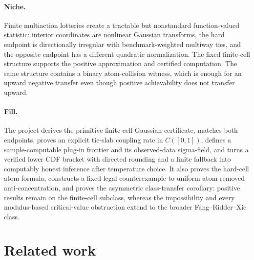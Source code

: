 \documentclass{article}
\begin{document}
\paragraph{Niche.} Finite multiaction lotteries create a tractable but nonstandard function-valued statistic: interior coordinates are nonlinear Gaussian transforms, the hard endpoint is directionally irregular with benchmark-weighted multiway ties, and the opposite endpoint has a different quadratic normalization. The fixed finite-cell structure supports the positive approximation and certified computation. The same structure contains a binary atom-collision witness, which is enough for an upward negative transfer even though positive achievability does not transfer upward.

\paragraph{Fill.} The project derives the primitive finite-cell Gaussian certificate, matches both endpoints, proves an explicit tie-slab coupling rate in \(C([0,1])\), defines a sample-computable plug-in frontier and its observed-data sigma-field, and turns a verified lower CDF bracket with directed rounding and a finite fallback into computably honest inference after temperature choice. It also proves the hard-cell atom formula, constructs a fixed legal counterexample to uniform atom-removed anti-concentration, and proves the asymmetric class-transfer corollary: positive results remain on the finite-cell subclass, whereas the impossibility and every modulus-based critical-value obstruction extend to the broader Fang--Ridder--Xie class.

\section{Related work}
\end{document}
